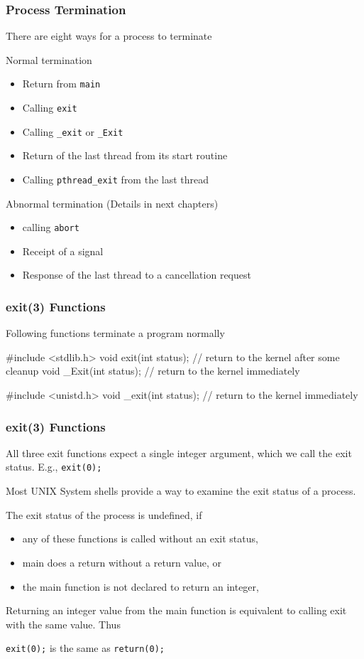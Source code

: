 \documentclass[newPxFont,sthlmFooter,nooffset]{beamer}
\begin{document}
\begin{frame}[t]
  \frametitle{Process Termination}

There are eight ways for a process to terminate

Normal termination
\begin{itemize}
\item Return from \texttt{main}
\item Calling \texttt{exit}
\item Calling \texttt{\_exit} or \texttt{\_Exit}
\item Return of the last thread from its start routine
\item Calling \texttt{pthread\_exit} from the last thread
\end{itemize}

Abnormal termination (Details in next chapters)
\begin{itemize}
\item calling \texttt{abort}
\item Receipt of a signal
\item Response of the last thread to a cancellation request
\end{itemize}

\end{frame}

\begin{frame}[containsverbatim,t]
  \frametitle{exit(3) Functions}
Following functions terminate a program normally
\begin{codedef}
#include <stdlib.h>
void exit(int status); // return to the kernel after some cleanup
void _Exit(int status); // return to the kernel immediately

#include <unistd.h>
void _exit(int status);  // return to the kernel immediately
\end{codedef}

\end{frame}

\begin{frame}[t]
  \frametitle{exit(3) Functions}
All three exit functions expect a single integer argument, which we
call the exit status. E.g., \texttt{exit(0);}

Most UNIX System shells provide a way to examine the exit status of a
process.

The exit status of the process is undefined, if
\begin{itemize}
\item any of these functions is called without an exit status,
\item main does a return without a return value, or
\item the main function is not declared to return an integer,
\end{itemize}

Returning an integer value from the main function is equivalent to calling exit with the same value. Thus

\texttt{exit(0);}
is the same as
\texttt{return(0);}
\end{frame}
\end{document}
